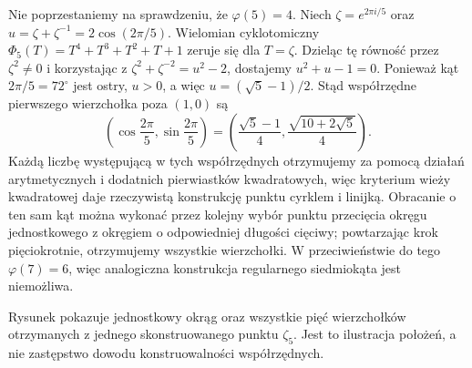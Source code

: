 \begin{przyklad}
\label{aa:prz:constructible-pentagon}
Nie poprzestaniemy na sprawdzeniu, że $\varphi(5)=4$.
Niech $\zeta=e^{2\pi i/5}$ oraz
$u=\zeta+\zeta^{-1}=2\cos(2\pi/5)$.
Wielomian cyklotomiczny $\Phi_5(T)=T^4+T^3+T^2+T+1$
zeruje się dla $T=\zeta$. Dzieląc tę równość przez
$\zeta^2\ne0$ i korzystając z
$\zeta^2+\zeta^{-2}=u^2-2$, dostajemy
$u^2+u-1=0$. Ponieważ kąt $2\pi/5=72^\circ$ jest ostry,
$u>0$, a więc $u=(\sqrt5-1)/2$.
Stąd współrzędne pierwszego wierzchołka poza $(1,0)$ są
\[
 \left(\cos\frac{2\pi}{5},\sin\frac{2\pi}{5}\right)
 =\left(\frac{\sqrt5-1}{4},\frac{\sqrt{10+2\sqrt5}}4\right).
\]
Każdą liczbę występującą w tych współrzędnych otrzymujemy
za pomocą działań arytmetycznych i dodatnich pierwiastków
kwadratowych, więc kryterium wieży kwadratowej daje
rzeczywistą konstrukcję punktu cyrklem i linijką.
Obracanie o ten sam kąt można wykonać przez kolejny wybór
punktu przecięcia okręgu jednostkowego z okręgiem o
odpowiedniej długości cięciwy; powtarzając krok pięciokrotnie,
otrzymujemy wszystkie wierzchołki.
W przeciwieństwie do tego $\varphi(7)=6$, więc
analogiczna konstrukcja regularnego siedmiokąta jest niemożliwa.

\begin{center}
\end{center}
Rysunek pokazuje jednostkowy okrąg oraz wszystkie pięć
wierzchołków otrzymanych z jednego skonstruowanego punktu
$\zeta_5$. Jest to ilustracja położeń, a nie zastępstwo
dowodu konstruowalności współrzędnych.
\end{przyklad}

